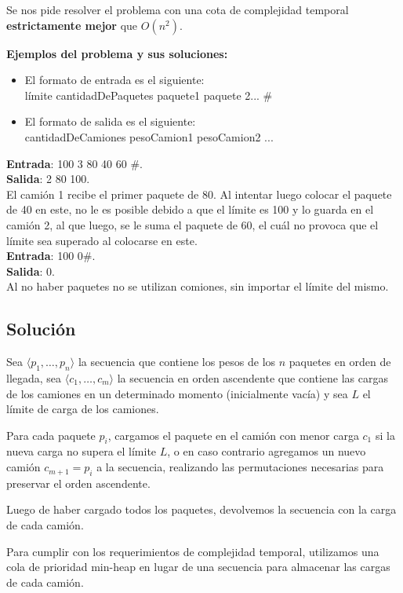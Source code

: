 \documentclass[a4paper,10pt,twoside]{article}
\begin{document}
Se nos pide resolver el problema con una cota de complejidad temporal \textbf{estrictamente mejor} que $O(n^2)$.

\textbf{Ejemplos del problema y sus soluciones:}
\begin{itemize}
	\item El formato de entrada es el siguiente: \\
  límite cantidadDePaquetes paquete1 paquete 2... \#
	\item El formato de salida es el siguiente: \\
	cantidadDeCamiones pesoCamion1 pesoCamion2 ...
\end{itemize}

\textbf{Entrada}: 100 3 80 40 60 \#.\\
\textbf{Salida}: 2 80 100. \\
El camión 1 recibe el primer paquete de 80. Al intentar luego colocar el paquete de 40 en este, no le es posible debido a que el límite es 100 y lo guarda en el camión 2, al que luego, se le suma el paquete de 60, el cuál no provoca que el límite sea superado al colocarse en este.\\

\textbf{Entrada}: 100 0\#.\\
\textbf{Salida}: 0. \\
Al no haber paquetes no se utilizan comiones, sin importar el límite del mismo.

\subsection{Solución}

Sea $\langle p_1, \ldots, p_n \rangle$ la secuencia que contiene los pesos de los $n$ paquetes en orden de llegada, sea $\langle c_1, \ldots, c_m \rangle$ la secuencia en orden ascendente que contiene las cargas de los camiones en un determinado momento (inicialmente vacía) y sea $L$ el límite de carga de los camiones.

Para cada paquete $p_i$, cargamos el paquete en el camión con menor carga $c_1$ si la nueva carga no supera el límite $L$, o en caso contrario agregamos un nuevo camión $c_{m+1} = p_i$ a la secuencia, realizando las permutaciones necesarias para preservar el orden ascendente.

Luego de haber cargado todos los paquetes, devolvemos la secuencia con la carga de cada camión.

Para cumplir con los requerimientos de complejidad temporal, utilizamos una cola de prioridad min-heap en lugar de una secuencia para almacenar las cargas de cada camión.
\end{document}
